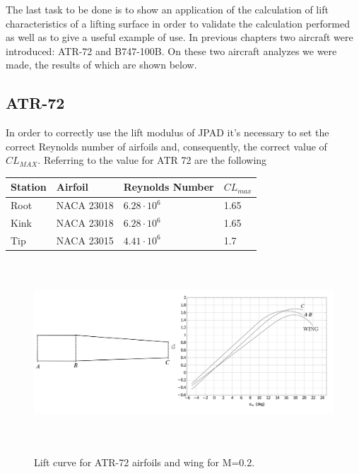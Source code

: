 The last task to be done is to show an application of the calculation of lift characteristics of a lifting surface in order
to validate the calculation performed as well as to give a useful example of use. In previous chapters two aircraft were introduced:
ATR-72 and B747-100B. On these two aircraft analyzes we were made, the results of which are shown below.\\

\subsection{ATR-72}

In order to correctly use the lift modulus of JPAD it's necessary to set the correct Reynolds number of airfoils and, consequently, the correct value of $CL_{MAX}$. Referring to \cite{Abbott} the value for ATR 72 are the following

\begin{center}
	\begin{tabular}{ | l | l | l | l |}
		\hline
		Station & Airfoil & Reynolds Number & $CL_{max}$ \\ \hline
		Root & NACA 23018 & $6.28 \cdot 10^6$ & 1.65 \\ \hline
		Kink & NACA 23018 &  $6.28 \cdot 10^6$ & 1.65 \\ \hline
		Tip & NACA 23015 & $4.41 \cdot 10^6$ & 1.7 \\
		\hline
	\end{tabular}
\end{center}


\begin{figure}[H]
	\centering
	{\includegraphics[height=6.8cm]{Immagini/ATR_Topview.pdf}} 
	\caption{Lift curve for ATR-72 airfoils and wing for M=0.2.}
	\label{fig:clalf}
\end{figure}

